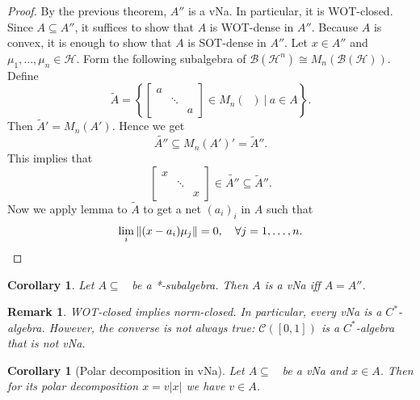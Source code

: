 \documentclass[10pt, a4paper]{article}
\newtheorem{corollary}[thm]{Corollary}
\newtheorem*{remark}{Remark}
\newenvironment{noticeC}{%
  \tcolorbox[%
  notitle,
  empty,
  enhanced,  %
  breakable,
  coltext=black, 
  fontupper=\rmfamily,
  noparskip,
  sharp corners,
  boxrule=-1pt,  %
  frame hidden,
  left=7pt,  %
  right=7pt,
  top=5pt,
  bottom=5pt,
  before skip=2.5ex plus 2pt,
  after skip=2.5ex plus 2pt,
  overlay unbroken and last={%
  },
  ]}
{\endtcolorbox}
\newenvironment{myproof}%
  {\begin{noticeC}\begin{proof}}%
  {\end{proof}\end{noticeC}}
\DeclareMathOperator{\bh}{\mathcal{B} (\mathcal{H})}
\begin{document}
\begin{myproof}
  By the previous theorem, $A''$ is a vNa. In particular, it is WOT-closed.
  Since $A \subseteq A''$, it suffices to show that $A$ is WOT-dense in $A''$.
  Because $A$ is convex, it is enough  to show that $A$ is SOT-dense in $A''$.
  Let $x \in A''$ and $\mu_1,\dots, \mu_n \in \mathcal{H}$. Form the following subalgebra of $\mathcal{B} (\mathcal{H}^n) \cong M_n (\mathcal{B}(\mathcal{H})).$
  Define 
  $$\widetilde{A} = \left\lbrace \begin{bmatrix}
    a & &\\
    & \ddots &\\
    & & a
  \end{bmatrix} \in M_n (\bh)\ |\ a \in A\right\rbrace.$$
  Then $\widetilde{A}' = M_n (A')$.
  Hence we get 
  $$\widetilde{A''} \subseteq M_n (A') ' = \widetilde{A}''.$$
  This implies that $$\begin{bmatrix}
    x & &\\
    & \ddots &\\
    & & x
  \end{bmatrix} \in \widetilde{A''} \subseteq \widetilde{A}''.$$
  Now we apply lemma to $\widetilde{A}$ to get a net $(a_i)_i$ in $A$
  such that 
  \begin{equation*}
    \lim_{i} \| (x - a_i) \mu_j \| = 0,\quad \forall j = 1, \dots, n. \qedhere
  \end{equation*}
\end{myproof}

\begin{corollary}
  Let $A \subseteq \bh$ be a *-subalgebra. Then $A$ is a vNa iff $A = A''$.
\end{corollary}

\begin{remark}
  WOT-closed implies norm-closed. In particular, every vNa is a $C^*$-algebra.
  However, the converse is not always true: $\mathcal{C} ([0, 1])$ is a $C^*$-algebra that is not vNa.
\end{remark}


\begin{corollary}[Polar decomposition in vNa]
  Let $A \subseteq \bh$ be a vNa and $x \in A$.
  Then for its polar decomposition $x = v|x|$ we have $v \in A$.
\end{corollary}
\end{document}
